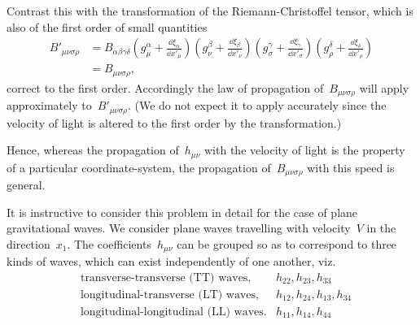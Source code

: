 \documentclass[12pt]{book}
\begin{document}
Contrast this with the transformation of the Riemann\hyp{}Christoffel tensor, which is also of the first order of small
quantities
\begin{align*}
B'_{\mu\nu\sigma\rho} & = B_{\alpha\beta\gamma\delta}
                              \left(g^\alpha_\mu    + \frac{\dd\xi_\alpha}{\dd x'_\mu}\right)
                              \left(g^\beta_\nu     + \frac{\dd\xi_\beta} {\dd x'_\nu}\right)
                              \left(g^\gamma_\sigma + \frac{\dd\xi_\gamma}{\dd x'_\sigma}\right)
                              \left(g^\delta_\rho   + \frac{\dd\xi_\delta}{\dd x'_\rho}\right)\\
                      & = B_{\mu\nu\sigma\rho},
\end{align*}
correct to the first order.
Accordingly the law of propagation of~$B_{\mu\nu\sigma\rho}$ will apply approximately to~$B'_{\mu\nu\sigma\rho}$.
(We do not expect it to apply accurately since the velocity of light is altered to the first order by the
transformation.)

Hence, whereas the propagation of~$h_{\mu\nu}$ with the velocity of light is the property of a particular
coordinate\hyp{}system, the propagation of~$B_{\mu\nu\sigma\rho}$ with this speed is general.

It is instructive to consider this problem in detail for the case of plane gravitational waves.
We consider plane waves travelling with velocity~$V$ in the direction~$x_1$.
The coefficients~$h_{\mu\nu}$ can be grouped so as to correspond to three kinds of waves, which can exist
independently of one another, viz.
\begin{align*}%
& \text{transverse-transverse (TT) waves,}     & h_{22}, h_{23}, h_{33}\\
& \text{longitudinal-transverse (LT) waves,}   & h_{12}, h_{24}, h_{13}, h_{34}\\
& \text{longitudinal-longitudinal (LL) waves.} & h_{11}, h_{14}, h_{44}\\
\end{align*}
\end{document}
